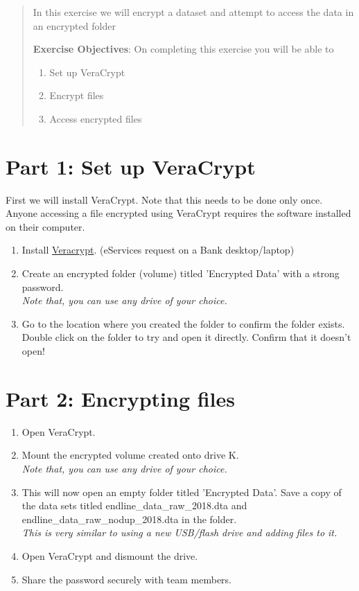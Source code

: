 \documentclass{tufte-handout}
\begin{document}
\begin{abstract}
In this exercise we will encrypt a dataset and attempt to access the data in an encrypted folder

\bigskip\noindent \textbf{Exercise Objectives}: On completing this exercise you will be able to
\begin{enumerate}
  \item Set up VeraCrypt
  \item Encrypt files
  \item Access encrypted files
\end{enumerate}
\end{abstract}

\section{Part 1: Set up VeraCrypt}

First we will install VeraCrypt. Note that this needs to be done only once. Anyone accessing a file encrypted using VeraCrypt requires the software installed on their computer.

\begin{enumerate}
	\item Install \href{https://www.veracrypt.fr/en/Downloads.html}{Veracrypt}. (eServices request on a Bank desktop/laptop)
	\item Create an encrypted folder (volume) titled 'Encrypted Data' with a strong password. \\
	\textit{Note that, you can use any drive of your choice.}
	\item Go to the location where you created the folder to confirm the folder exists.
	Double click on the folder to try and open it directly. Confirm that it doesn't open!
\end{enumerate}

\section{Part 2: Encrypting files}
\begin{enumerate}
	\item Open VeraCrypt.
	\item Mount the encrypted volume created onto drive K. \\
	\textit{Note that, you can use any drive of your choice.}
	\item This will now open an empty folder titled 'Encrypted Data'. Save a copy of the data sets titled endline\_data\_raw\_2018.dta and endline\_data\_raw\_nodup\_2018.dta in the folder. \\
	\textit{This is very similar to using a new USB/flash drive and adding files to it.}
	\item Open VeraCrypt and dismount the drive.
	\item Share the password securely with team members.
	
\end{enumerate}
\end{document}
